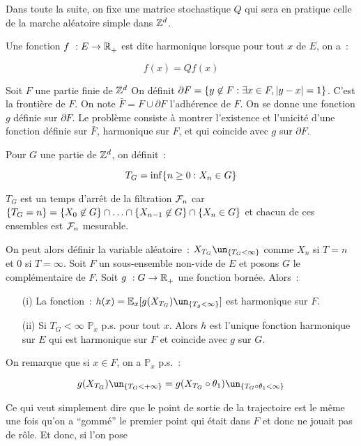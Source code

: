 Dans toute la suite, on fixe une matrice stochastique $Q$ qui sera en pratique celle de la marche aléatoire
simple dans ${\mathbb{Z}}^d$.\par
{} Une fonction $f~:E\to\mathbb{R}^{}_+$ est dite harmonique lorsque pour tout $x$ de 
$E$, on a~:\par
$$f(x)=Qf(x)$$\par
{}
Soit $F$ une partie finie de ${\mathbb{Z}}^d$ On définit $\partial F = \{y\not\in F :\exists x\in F, \left|y-x\right|=1\}$.
C'est la frontière de $F$. On note $\bar{F} = F\cup\partial F$ l'adhérence de $F$. On se donne une fonction
$g$ définie sur $\partial F$. Le problème consiste à montrer l'existence et l'unicité d'une fonction définie 
sur $\bar{F}$, harmonique sur $F$, et qui coincide avec $g$ sur $\partial F$.\par
{} Pour $G$ une partie de ${\mathbb{Z}}^d$, on définit~:\par
$$T_G = \inf\{n\geq 0 : X_n\in G\}$$\par
$T_G$ est un temps d'arrêt de la filtration $\mathcal{F}_n$ car $\{T_G = n\} = \{X_0\not\in G\}\cap
\ldots\cap\{X_{n-1}\not\in G\}\cap\{X_n\in G\}$ et chacun de ces ensembles est $\mathcal{F}_n$ mesurable.\par
On peut alors définir la variable aléatoire~: $X_{T_G}\un_{\ens{T_G<\infty}}$ comme $X_n$ si $T = n$ et $0$
si $T=\infty$.
\theoreme{} Soit $F$ un sous-ensemble non-vide de $E$ et posons $G$ le complémentaire de $F$. Soit 
$g~:G\to\mathbb{R}^{}_+$ une fonction bornée. Alors~:\par
\begin{itemize}
\item[(i)]{} La fonction~: $h(x) = \mathbb{E}_x\lbrack g(X_{T_G})\un_{\ens{T_g<\infty}}\rbrack$ est harmonique
sur $F$.
\item[(ii)]{} Si $T_G<\infty$ $\mathbb{P}_x$ p.s. pour tout $x$. Alors $h$ est l'unique fonction harmonique 
sur $E$ qui est harmonique sur $F$ et coincide avec $g$ sur $G$.
\end{itemize}
\dem On remarque que si $x\in F$, on a $\mathbb{P}_x$ p.s.~:\par
$$g(X_{T_G})\un_{\ens{T_G<+\infty}} = g(X_{T_G}\circ\theta_1)\un_{\ens{T_G\circ \theta_1<\infty}}$$\par
Ce qui veut simplement dire que le point de sortie de la trajectoire est le même une fois qu'on a ``gommé''
le premier point qui était dans $F$ et donc ne jouait pas de rôle. Et donc, si l'on pose 
